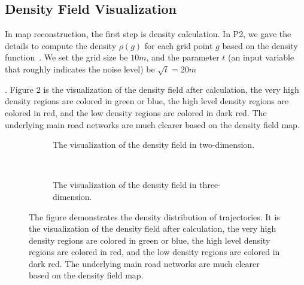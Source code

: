 \documentclass[11pt]{article}
\begin{document}
\subsection*{Density Field Visualization}
In map reconstruction, the first step is density calculation.  In P2,  we gave the details to compute the density $\rho(g)$ for each grid point $g$ based on the density function~\cite{Wang15}. We set the grid size be $10m$, and the parameter $t$ (an input variable that roughly indicates the noise level) be $\sqrt{t}=20 m$ \begin{comment} we should not include this unless we can say how we know what to approximate the noise as!!!!!!!!\end{comment}. Figure $2$ is the visualization of the density field after calculation, the very high density regions are colored in green or blue, the high level density regions are colored in red, and the low density regions are colored in dark red. The underlying main road networks are much clearer based on the density field map. 

\begin{figure*}[t!]
    \centering
    \begin{subfigure}[t]{0.5\textwidth}
        \centering
        \caption{The visualization of the density field in two-dimension.}
    \end{subfigure}%
    ~
    \begin{subfigure}[t]{0.5\textwidth}
        \centering
        \caption{The visualization of the density field in three-dimension.}
    \end{subfigure}
    \caption{The figure demonstrates the density distribution of trajectories. It is the visualization of the density field after calculation, the very high density regions are colored in green or blue, the high level density regions are colored in red, and the low density regions are colored in dark red. The underlying main road networks are much clearer based on the density field map.}
\end{figure*}
\end{document}
